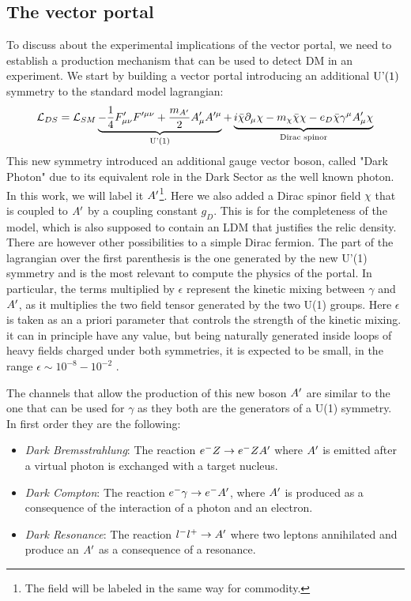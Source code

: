 \subsection{The vector portal}
\label{ch1:sec:dm-colliders}

To discuss about the experimental implications of the vector portal, we need to establish a production mechanism that can be used to detect DM in an experiment. We start by building a vector portal introducing an additional $\textrm{U'(1)}$ symmetry to the standard model lagrangian:
\begin{equation}
  \label{eq:dm-lagrangian}
  \mathcal{L}_{DS} = \mathcal{L}_{SM} \underbrace{- \frac{1}{4}F'_{\mu \nu}F'^{\mu \nu} + \frac{m_{A'}}{2}A'_{\mu}A'^{\mu}}_{\textrm{U'(1)}} + \underbrace{i \bar{\chi} \partial_{\mu} \chi - m_{\chi}\bar{\chi}\chi - e_D \bar{\chi}\gamma^{\mu}A'_{\mu}\chi}_{\textrm{Dirac spinor}}
\end{equation}
This new symmetry introduced an additional gauge vector boson, called "Dark Photon" due to its equivalent role in the Dark Sector as the well known photon. In this work, we will label it $A'$\footnote{The field will be labeled in the same way for commodity.}. Here we also added a Dirac spinor field $\chi$ that is coupled to $A'$ by a coupling constant $g_D$. This is for the completeness of the model, which is also supposed to contain an LDM that justifies the relic density. There are however other possibilities to a simple Dirac fermion. The part of the lagrangian over the first parenthesis is the one generated by the new U'(1) symmetry and is the most relevant to compute the physics of the portal. In particular, the terms multiplied by $\epsilon$ represent the kinetic mixing between $\gamma$ and $A'$, as it multiplies the two field tensor generated by the two U(1) groups. Here $\epsilon$ is taken as an a priori parameter that controls the strength of the kinetic mixing. it can in principle have any value, but being naturally generated inside loops of heavy fields charged under both symmetries, it is expected to be small, in the range $\epsilon \sim 10^{-8} - 10^{-2}$ \cite{jdb}. 

The channels that allow the production of this new boson $A'$ are similar to the one that can be used for $\gamma$ as they both are the generators of a U(1) symmetry. In first order they are the following:

\begin{itemize}
\item \textit{Dark Bremsstrahlung}: The reaction $e^- Z \to e^- Z A'$ where $A'$ is emitted after a virtual photon is exchanged with a target nucleus.
\item \textit{Dark Compton}: The reaction $e^- \gamma \to e^- A'$, where $A'$ is produced as a consequence of the interaction of a photon and an electron.
\item \textit{Dark Resonance}: The reaction $l^- l^+ \to A'$ where two leptons annihilated and produce an $A'$ as a consequence of a resonance.
\end{itemize}

